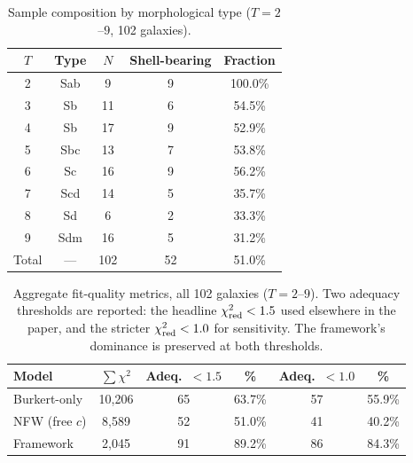 \documentclass[linenumbers]{aastex701}
\newcommand{\chired}{\chi^2_{\rm red}}
\begin{document}
\begin{table}
\centering
\small
\caption{Sample composition by morphological type ($T=2$--$9$, 102 galaxies).}\label{tab:sample}
\begin{tabular}{cccc c}
\hline\hline
$T$ & Type & $N$ & Shell-bearing & Fraction \\
\hline
2 & Sab  & 9   & 9  & 100.0\% \\
3 & Sb   & 11  & 6  & 54.5\%  \\
4 & Sb   & 17  & 9  & 52.9\%  \\
5 & Sbc  & 13  & 7  & 53.8\%  \\
6 & Sc   & 16  & 9  & 56.2\%  \\
7 & Scd  & 14  & 5  & 35.7\%  \\
8 & Sd   & 6   & 2  & 33.3\%  \\
9 & Sdm  & 16  & 5  & 31.2\%  \\
\hline
Total & --- & 102 & 52 & 51.0\% \\
\hline
\end{tabular}
\end{table}

\begin{table}
\centering
\small
\caption{Aggregate fit-quality metrics, all 102 galaxies ($T=2$--$9$). Two adequacy thresholds are reported: the headline $\chired < 1.5$ used elsewhere in the paper, and the stricter $\chired < 1.0$ for sensitivity. The framework's dominance is preserved at both thresholds.}\label{tab:fitquality}
\begin{tabular}{l c c c c c}
\hline\hline
Model            & $\sum \chi^2$ & Adeq.\ $< 1.5$ & \%      & Adeq.\ $< 1.0$ & \% \\
\hline
Burkert-only     & 10{,}206 & 65 & 63.7\% & 57 & 55.9\% \\
NFW (free $c$)   & 8{,}589  & 52 & 51.0\% & 41 & 40.2\% \\
Framework        & 2{,}045  & 91 & 89.2\% & 86 & 84.3\% \\
\hline
\end{tabular}
\end{table}
\end{document}
